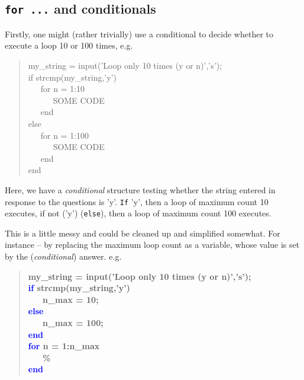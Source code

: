 \documentclass{tufte-book} %
\newenvironment{docspec}{\begin{quotation}\ttfamily\parskip0pt\parindent0pt\ignorespaces}{\end{quotation}}
\newenvironment{docspecbold}{\begin{quotation}\ttfamily\bfseries\parskip0pt\parindent0pt\ignorespaces}{\end{quotation}}
\begin{document}


\subsection{\texttt{for ...} and conditionals}

Firstly, one might (rather trivially) use a conditional to decide whether to execute a loop 10 or 100 times, e.g.

\begin{docspec}
my\_string = input('Loop only 10 times (y or n)','s');
\\ if strcmp(my\_string,'y')
\\ \ \ \ for n = 1:10
\\ \ \ \ \ \ \ SOME CODE
\\ \ \ \ end
\\ else
\\ \ \ \ for n = 1:100
\\ \ \ \ \ \ \ SOME CODE
\\ \ \ \ end
\\ end
\end{docspec}

Here, we have a \textit{conditional} structure testing whether the string entered in response to the questions is 'y'. \texttt{If} 'y', then a loop of maximum count 10 executes, if not ('y') (\texttt{else}), then a loop of maximum count 100 executes.

This is a little messy and could be cleaned up and simplified somewhat. For instance -- by replacing the maximum loop count as a variable, whose value is set by the (\textit{conditional}) answer. e.g.

\begin{docspecbold}
my\_string = input('Loop only 10 times (y or n)','s');
\\ \textcolor{blue}{if} strcmp(my\_string,'y')
\\ \ \ \ n\_max = 10;
\\ \textcolor{blue}{else}
\\ \ \ \ n\_max = 100;
\\ \textcolor{blue}{end}
\\ \textcolor{blue}{for} n = 1:n\_max
\\ \ \ \ \textcolor[rgb]{0,0.501961,0}{\%}
\\ \textcolor{blue}{end}
\end{docspecbold}
\end{document}
